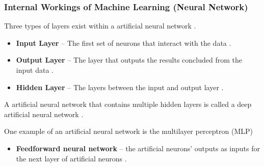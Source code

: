 \documentclass{beamer}
\begin{document}
\begin{frame}
\frametitle{Internal Workings of Machine Learning (Neural Network)}
\footnotesize
Three types of layers exist within a artificial neural network \cite{pythonML}.

\begin{itemize}
\item \textbf{Input Layer} -- The first set of neurons that interact with the data \cite{pythonML}.
\item \textbf{Output Layer} -- The layer that outputs the results concluded from the input data \cite{pythonML}.
\item \textbf{Hidden Layer} -- The layers between the input and output layer \cite{pythonML}.
\end{itemize}

A artificial neural network that contains multiple hidden layers is called a deep artificial neural network \cite{pythonML}.
\newline

One example of an artificial neural network is the multilayer perceptron (MLP)
\begin{itemize}
\item \textbf{Feedforward neural network} -- the artificial neurons' outputs as inputs for the next layer of artificial neurons \cite{pythonML}. 
\end{itemize}


\end{frame}
\end{document}
